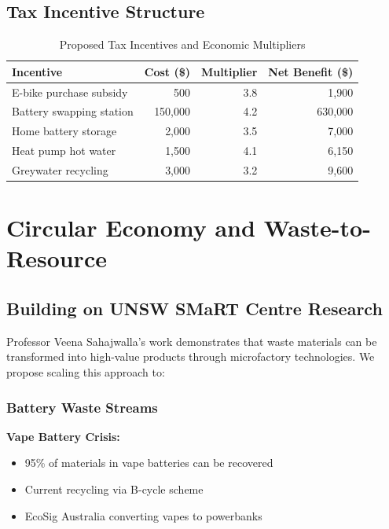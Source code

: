 \documentclass[12pt,a4paper]{article}
\begin{document}
\subsection{Tax Incentive Structure}

\begin{table}[h]
\centering
\caption{Proposed Tax Incentives and Economic Multipliers}
\begin{tabular}{lrrr}
\toprule
\textbf{Incentive} & \textbf{Cost (\$)} & \textbf{Multiplier} & \textbf{Net Benefit (\$)} \\
\midrule
E-bike purchase subsidy & 500 & 3.8 & 1,900 \\
Battery swapping station & 150,000 & 4.2 & 630,000 \\
Home battery storage & 2,000 & 3.5 & 7,000 \\
Heat pump hot water & 1,500 & 4.1 & 6,150 \\
Greywater recycling & 3,000 & 3.2 & 9,600 \\
\bottomrule
\end{tabular}
\end{table}

\section{Circular Economy and Waste-to-Resource}

\subsection{Building on UNSW SMaRT Centre Research}

Professor Veena Sahajwalla's work demonstrates that waste materials can be transformed into high-value products through microfactory technologies. We propose scaling this approach to:

\subsubsection{Battery Waste Streams}

\textbf{Vape Battery Crisis:}
\begin{itemize}
    \item 95\% of materials in vape batteries can be recovered
    \item Current recycling via B-cycle scheme
    \item EcoSig Australia converting vapes to powerbanks
\end{itemize}
\end{document}
